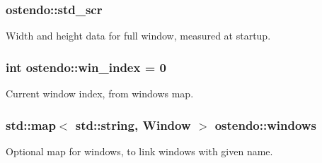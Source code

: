 \subsubsection[{\texorpdfstring{std\+\_\+scr}{std_scr}}]{ ostendo\+::std\+\_\+scr}\hypertarget{namespaceostendo_a4c5850c8a109e159e874ecce8a5dc62a}{}\label{namespaceostendo_a4c5850c8a109e159e874ecce8a5dc62a}
Width and height data for full window, measured at startup. 
\subsubsection[{\texorpdfstring{win\+\_\+index}{win_index}}]{\setlength{\rightskip}{0pt plus 5cm}int ostendo\+::win\+\_\+index = 0}\hypertarget{namespaceostendo_a3267a8b4ac0d3934af4bf5f8079d0f72}{}\label{namespaceostendo_a3267a8b4ac0d3934af4bf5f8079d0f72}
Current window index, from windows map. 
\subsubsection[{\texorpdfstring{windows}{windows}}]{\setlength{\rightskip}{0pt plus 5cm}std\+::map$<$ std\+::string, {\bf Window} $>$ ostendo\+::windows}\hypertarget{namespaceostendo_ab45e3689aa0cb8a2e3a175c0aed97880}{}\label{namespaceostendo_ab45e3689aa0cb8a2e3a175c0aed97880}
Optional map for windows, to link windows with given name. 
